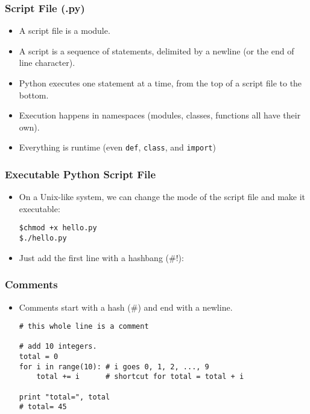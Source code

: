 \documentclass{beamer}
\begin{document}
\begin{frame}[fragile]
\frametitle{Script File (.py)}
\begin{itemize}
\item<1-> A script file is a module.
\item<1-> A script is a sequence of statements, delimited
      by a newline (or the end of line character).
\item<1-> Python executes one statement at a time, from 
      the top of a script file to the bottom.
\item<2-> Execution happens in namespaces (modules,
      classes, functions all have their own). 
\item<2-> Everything is runtime (even \lstinline{def},
      \lstinline{class}, and \lstinline{import})
\end{itemize}
\end{frame}

\begin{frame}[fragile]
\frametitle{Executable Python Script File}
\begin{itemize}
\item On a Unix-like system, we can change the mode
      of the script file and make it executable:
\begin{lstlisting}
$chmod +x hello.py
$./hello.py
\end{lstlisting}
\item Just add the first line with
      a hashbang (\#!):
      
\end{itemize}
\end{frame}

\begin{frame}[fragile]
\frametitle{Comments}
\begin{itemize}
\item Comments start with a hash (\#) and end
      with a newline.
\begin{lstlisting}
# this whole line is a comment

# add 10 integers.
total = 0
for i in range(10): # i goes 0, 1, 2, ..., 9
    total += i      # shortcut for total = total + i

print "total=", total
# total= 45
\end{lstlisting}
\end{itemize}
\end{frame}
\end{document}
